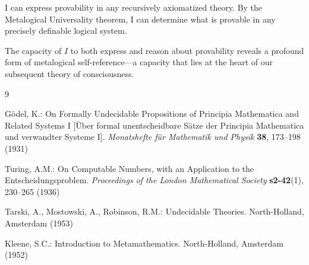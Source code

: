 \documentclass[runningheads]{llncs}
\begin{document}
\medskip

\begin{corollary}
    I can express provability in any recursively axiomatized theory. By the Metalogical Universality theorem, I can determine what is provable in any precisely definable logical system.
\end{corollary}

\medskip

\noindent
The capacity of $I$ to both express and reason about provability reveals a profound form of metalogical self-reference—a capacity that lies at the heart of our subsequent theory of consciousness.

\begin{thebibliography}{9}
    
    Gödel, K.: On Formally Undecidable Propositions of Principia Mathematica and Related Systems I [Über formal unentscheidbare Sätze der Principia Mathematica und verwandter Systeme I]. \textit{Monatshefte für Mathematik und Physik} \textbf{38}, 173--198 (1931)
    
    Turing, A.M.: On Computable Numbers, with an Application to the Entscheidungsproblem. \textit{Proceedings of the London Mathematical Society} \textbf{s2-42}(1), 230--265 (1936)
    
    Tarski, A., Mostowski, A., Robinson, R.M.: Undecidable Theories. North-Holland, Amsterdam (1953)
    
    Kleene, S.C.: Introduction to Metamathematics. North-Holland, Amsterdam (1952)
    
\end{thebibliography}
\end{document}
